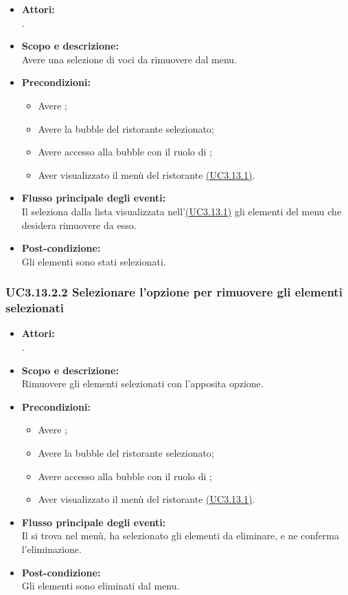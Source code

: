 \begin{itemize}
	\item \textbf{Attori:}
	\\.
	\item \textbf{Scopo e descrizione:} 
	\\Avere una selezione di voci da rimuovere dal menu.
	\item \textbf{Precondizioni:}
	\begin{itemize}
		\item Avere ;
		\item Avere la bubble del ristorante selezionato;
		\item Avere accesso alla bubble con il ruolo di ;
		\item Aver visualizzato il menù del ristorante \hyperref[UC3.13.1]{(UC3.13.1)}.
	\end{itemize}
	\item \textbf{Flusso principale degli eventi:}
	\\Il {} seleziona dalla lista visualizzata nell'\hyperref[UC3.13.1]{(UC3.13.1)} gli elementi del menu che desidera rimuovere da esso.
	\item \textbf{Post-condizione:}
	\\Gli elementi sono stati selezionati.
\end{itemize}

\subsubsection{UC3.13.2.2 Selezionare l’opzione per rimuovere gli elementi selezionati} \label{UC3.13.2.2}

\begin{itemize}
	\item \textbf{Attori:}
	\\.
	\item \textbf{Scopo e descrizione:} 
	\\Rimuovere gli elementi selezionati con l’apposita opzione.
	\item \textbf{Precondizioni:}
	\begin{itemize}
		\item Avere ;
		\item Avere la bubble del ristorante selezionato;
		\item Avere accesso alla bubble con il ruolo di ;
		\item Aver visualizzato il menù del ristorante \hyperref[UC3.13.1]{(UC3.13.1)}.
	\end{itemize}
	\item \textbf{Flusso principale degli eventi:}
	\\Il {} si trova nel menù, ha selezionato gli elementi da eliminare, e ne conferma l’eliminazione.
	\item \textbf{Post-condizione:}
	\\Gli elementi sono eliminati dal menu.
\end{itemize}

